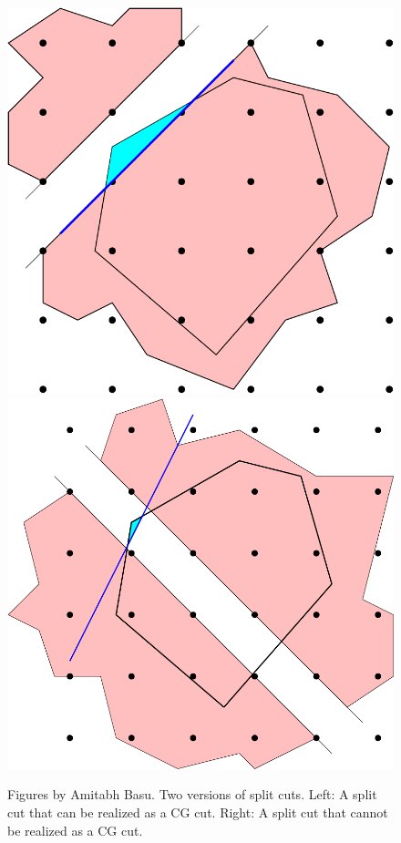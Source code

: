 \begin{figure}
\begin{center}
\includegraphics[scale = 0.35]{optimization/figures/figures-source/tikz/CG-cut-color.pdf}
\hspace{1cm}
\includegraphics[scale = 0.35]{optimization/figures/figures-source/tikz/cut-3-color.pdf}
\end{center}
\caption{Figures by Amitabh Basu.   Two versions of split cuts.   Left: A split cut that can be realized as a CG cut.  Right: A split cut that cannot be realized as a CG cut.}
\end{figure}
